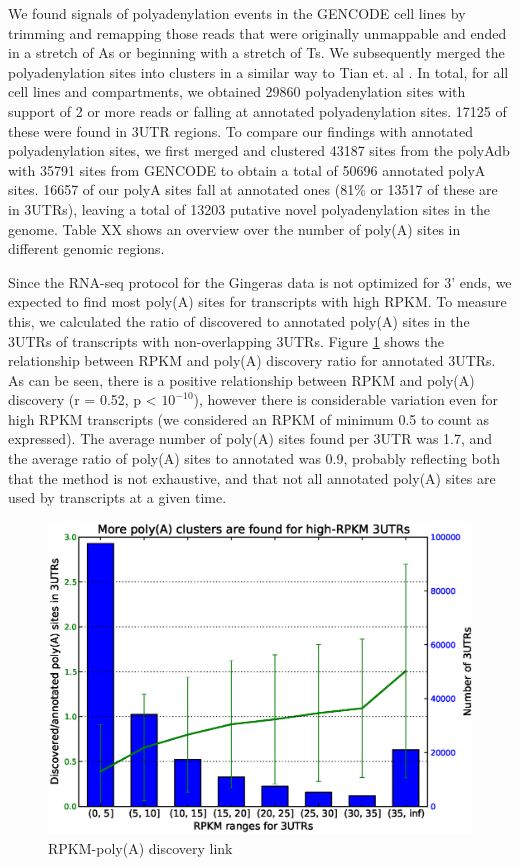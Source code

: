 \documentclass[a4paper]{article}
\begin{document}
 

We found signals of polyadenylation events in the GENCODE cell lines by
trimming and remapping those reads that were originally unmappable and ended in
a stretch of As or beginning with a stretch of Ts. We subsequently merged the
polyadenylation sites into clusters in a similar way to Tian et. al
\cite{tian_large-scale_2005}. In total, for all cell lines and compartments, we
obtained 29860 polyadenylation sites with support of 2 or more reads or falling
at annotated polyadenylation sites.  17125 of these were found in 3UTR regions.
To compare our findings with annotated polyadenylation sites, we first merged
and clustered 43187 sites from the polyAdb with 35791 sites from GENCODE to
obtain a total of 50696 annotated polyA sites. 16657 of our polyA sites fall at
annotated ones (81\% or 13517 of these are in 3UTRs), leaving a total of 13203
putative novel polyadenylation sites in the genome. Table XX shows an overview
over the number of poly(A) sites in different genomic regions.

Since the RNA-seq protocol for the Gingeras data is not optimized for 3' ends,
we expected to find most poly(A) sites for transcripts with high RPKM. To
measure this, we calculated the ratio of discovered to annotated poly(A) sites
in the 3UTRs of transcripts with non-overlapping 3UTRs. Figure \ref{fig:RPKM}
shows the relationship between RPKM and poly(A) discovery ratio for annotated
3UTRs. As can be seen, there is a positive relationship between RPKM and
poly(A) discovery (r = 0.52, p < $10^{-10}$), however there is considerable
variation even for high RPKM transcripts (we considered an RPKM of minimum 0.5
to count as expressed). The average number of poly(A) sites found per 3UTR was
1.7, and the average ratio of poly(A) sites to annotated was 0.9, probably
reflecting both that the method is not exhaustive, and that not all annotated
poly(A) sites are used by transcripts at a given time.

\begin{figure}[h]
	\centering
		\includegraphics[scale=0.5]{../Figures/More_polyA_clusters_for_high_RPKM_3UTRS.eps}
	\caption{RPKM-poly(A) discovery link}
	\label{fig:RPKM}
\end{figure}
\end{document}
